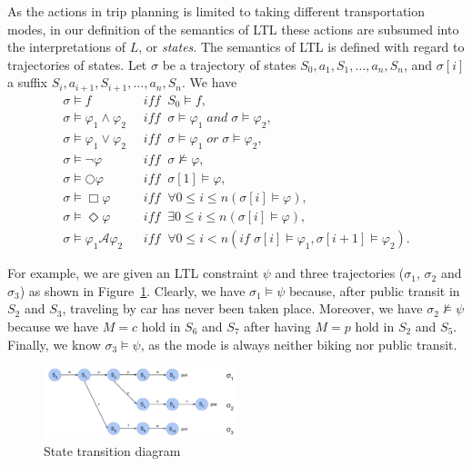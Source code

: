 \documentclass[letterpaper]{article}
\newcommand{\cA}{\mathcal{A}}
\newcommand{\tit}[1]{\textit{#1}}
\newcommand{\IFF}{\textit{iff}}
\newcommand{\IF}{\textit{if}}
\newcommand{\figref}[1]{Figure~\ref{fig:#1}}
\begin{document}
As the actions in trip planning is limited to taking different transportation modes,
in our definition of the semantics of LTL
these actions are subsumed into the interpretations of $L$, or \tit{states}.
The semantics of LTL is defined with regard to trajectories of states. 
Let $\sigma$ be a trajectory of states $S_0,a_1,S_1,\ldots,a_n,S_n$, and
$\sigma[i]$ a suffix $S_i, a_{i+1}, S_{i+1}, \ldots,a_n,S_n$.  We have
\begin{align*}
	\sigma \models f \;\; &\IFF \;\; S_0 \models f,\\
	\sigma \models \varphi_1 \land \varphi_2 \;\; &\IFF \;\; \sigma \models \varphi_1 \; and \; \sigma \models \varphi_2,\\
	\sigma \models \varphi_1 \lor \varphi_2 \;\; &\IFF \;\; \sigma \models \varphi_1 \; or \; \sigma \models \varphi_2,\\
	\sigma \models \neg \varphi \;\; &\IFF \;\; \sigma \not \models \varphi,\\
	\sigma \models \bigcirc \varphi \;\; &\IFF \;\; \sigma[1] \models \varphi,\\
	\sigma \models \Box \varphi \;\; &\IFF \;\; \forall 0 \leq i \leq n (\sigma[i] \models \varphi),\\
	\sigma \models \Diamond \varphi \;\; &\IFF \;\; \exists 0 \leq i \leq n (\sigma[i] \models \varphi),\\
	\sigma \models \varphi_1 \cA \varphi_2 \;\; &\IFF \;\; \forall 0 \leq i < n (\IF \; \sigma[i] \models \varphi_1, \sigma[i+1] \models \varphi_2).
\end{align*}

For example, we are given an LTL constraint $\psi$ and three trajectories ($\sigma_1$, $\sigma_2$ and $\sigma_3$)
as shown in \figref{trjs}.
Clearly, we have $\sigma_1 \models \psi$ because, after public transit in $S_2$ and $S_3$, 
traveling by car has never been taken place.
Moreover, we have $\sigma_2 \not \models \psi$ because we have $M=c$ hold in $S_6$ and $S_7$
after having $M=p$ hold in $S_2$ and $S_5$.
Finally, we know $\sigma_3 \models \psi$, as the mode is always neither biking nor public transit.

\begin{figure}[!ht]
  \centering
    \includegraphics[width=0.5\textwidth]{figs/trajectories.pdf}
  \caption{State transition diagram\label{fig:trjs}}
\end{figure}
\end{document}
